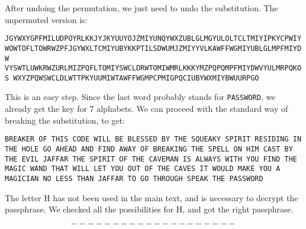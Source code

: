 \documentclass[11pt]{article}
\begin{document}
\pagebreak
  
After undoing the permutation, we just need to undo the substitution. The unpermuted version is:

\begin{center}
  \texttt{JGYWXYGPFMILUDPOYRLKKJYJKYUUYOJZMIYUNQYWXZUBLGLMGYULOLTCLTMIYIPKYCPWIY
  WOWTOFLTOWRWZPFJGYWXLTCMIYUBYKKPTILSDWUMJZMIYYVLKAWFFWGMIYUBLGLMPFMIYDW
  VYSWTLUWKRWZURLMIZPQFLTOMIYSWCLDRWTOMIWMRLKKKYMZPQPQMPFMIYDWVYULMRPQKOS
  WXYZPQWSWCLDLWTTPKYUUMIWTAWFFWGMPCPMIGPQCIUBYWXMIYBWUURPGO}
\end{center}
This is an easy step. Since the last word probably stands for \texttt{PASSWORD}, we already get the key for 7 alphabets. We can proceed with the standard way of breaking the substitution, to get:

\begin{center}
  \texttt{BREAKER OF THIS CODE WILL BE BLESSED BY THE SQUEAKY SPIRIT RESIDING IN THE HOLE GO AHEAD AND FIND AWAY OF BREAKING THE SPELL ON HIM CAST BY THE EVIL JAFFAR THE SPIRIT OF THE CAVEMAN IS ALWAYS WITH YOU FIND THE MAGIC WAND THAT WILL LET YOU OUT OF THE CAVES IT WOULD MAKE YOU A MAGICIAN NO LESS THAN JAFFAR TO GO THROUGH SPEAK THE PASSWORD}
\end{center}

\medskip

The letter H has not been used in the main text, and is necessary to decrypt the passphrase. We checked all the possibilities for H, and got the right passphrase.

$$--------------------$$
\end{document}

